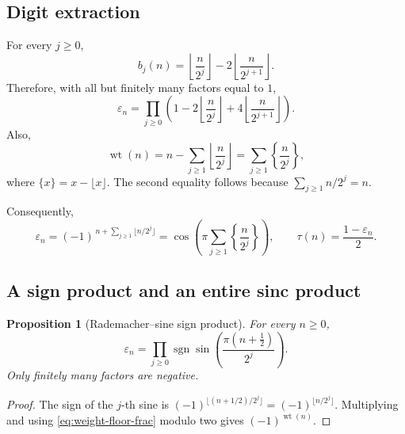 \documentclass[11pt,oneside]{article}
\numberwithin{equation}{section}
\newtheorem{proposition}[theorem]{Proposition}
\theoremstyle{definition}
\theoremstyle{remark}
\newcommand{\wt}{\operatorname{wt}}
\newcommand{\eps}{\varepsilon}
\newcommand{\TM}{\tau}
\begin{document}
\subsection{Digit extraction}

For every \(j\ge0\),
\begin{equation}
 b_j(n)=\left\lfloor\frac{n}{2^j}\right\rfloor
       -2\left\lfloor\frac{n}{2^{j+1}}\right\rfloor.
 \label{eq:digit-floor}
\end{equation}
Therefore, with all but finitely many factors equal to \(1\),
\begin{equation}
 \boxed{\eps_n=
 \prod_{j\ge0}\left(1-2\left\lfloor\frac{n}{2^j}\right\rfloor
 +4\left\lfloor\frac{n}{2^{j+1}}\right\rfloor\right).}
 \label{eq:pure-floor-product}
\end{equation}
Also,
\begin{equation}
 \wt(n)=n-\sum_{j\ge1}\left\lfloor\frac n{2^j}\right\rfloor
       =\sum_{j\ge1}\left\{\frac n{2^j}\right\},
 \label{eq:weight-floor-frac}
\end{equation}
where \(\{x\}=x-\lfloor x\rfloor\).  The second equality follows because
\(\sum_{j\ge1}n/2^j=n\).

Consequently,
\begin{equation}
 \eps_n=(-1)^{\,n+\sum_{j\ge1}\lfloor n/2^j\rfloor}
 =\cos\!\left(\pi\sum_{j\ge1}\left\{\frac n{2^j}\right\}\right),
 \qquad
 \TM(n)=\frac{1-\eps_n}{2}.
 \label{eq:floor-trig}
\end{equation}

\subsection{A sign product and an entire sinc product}

\begin{proposition}[Rademacher--sine sign product]
For every \(n\ge0\),
\begin{equation}
 \boxed{\eps_n=
  \prod_{j\ge0}\operatorname{sgn}
  \sin\!\left(\frac{\pi(n+\tfrac12)}{2^j}\right).}
 \label{eq:sine-sign-product}
\end{equation}
Only finitely many factors are negative.
\end{proposition}

\begin{proof}
The sign of the \(j\)-th sine is
\((-1)^{\lfloor(n+1/2)/2^j\rfloor}=(-1)^{\lfloor n/2^j\rfloor}\).
Multiplying and using \eqref{eq:weight-floor-frac} modulo two gives
\((-1)^{\wt(n)}\).
\end{proof}
\end{document}
